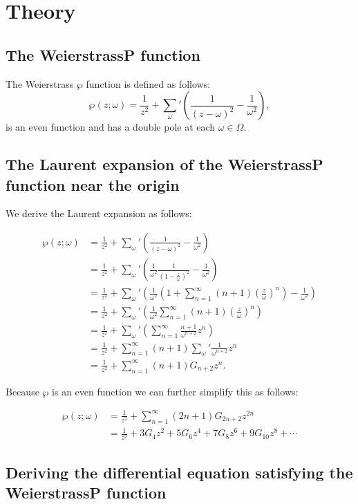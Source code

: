 \newpage
\section{Theory}

\subsection{The WeierstrassP function}

The Weierstrass $\wp$ function is defined as follows:
\[
    \wp(z; \omega) = \frac{1}{z^2} + \sum_{\omega}{'} ( \frac{1}{(z-\omega)^2} - \frac{1}{\omega^2} ) ,
\]
is an even function and has a double pole at each $\omega \in \Omega$.


\subsection{The Laurent expansion of the WeierstrassP function near the origin}

We derive the Laurent expansion as follows:

\begin{align*}
    \wp(z; \omega) &= \frac{1}{z^2} + \sum_{\omega}{'} ( \frac{1}{(z-\omega)^2} - \frac{1}{\omega^2} )  \\
    &= \frac{1}{z^2} + \sum_{\omega}{'} ( \frac{1}{\omega^2} \frac{1}{(1-\frac{z}{\omega})^2} - \frac{1}{\omega^2} )  \\
    &= \frac{1}{z^2} + \sum_{\omega}{'} ( \frac{1}{\omega^2} ( 1 + \sum_{n=1}^{\infty} (n+1)( \frac{z}{\omega} )^n ) - \frac{1}{\omega^2} )  \\
    &= \frac{1}{z^2} + \sum_{\omega}{'} ( \frac{1}{\omega^2} \sum_{n=1}^{\infty} (n+1)( \frac{z}{\omega} )^n )  \\
    &= \frac{1}{z^2} + \sum_{\omega}{'} ( \sum_{n=1}^{\infty} \frac{n+1}{\omega^{n+2}}z^n )  \\
    &= \frac{1}{z^2} + \sum_{n=1}^{\infty} (n+1) \sum_{\omega}{'} \frac{1}{\omega^{n+2}}z^n  \\
    &= \frac{1}{z^2} + \sum_{n=1}^{\infty} (n+1) G_{n+2} z^n .
\end{align*}

Because $\wp$ is an even function we can further simplify this as follows:

\begin{align*}
    \wp(z; \omega) &= \frac{1}{z^2} + \sum_{n=1}^{\infty} (2n+1) G_{2n+2} z^{2n} \\
    &= \frac{1}{z^2} + 3 G_4 z^2 + 5 G_6 z^4 +7 G_8 z^6 + 9 G_{10}z^8 + \cdots
\end{align*}


\subsection{Deriving the differential equation satisfying the WeierstrassP function}